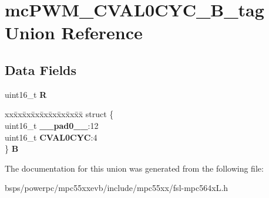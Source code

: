 \hypertarget{unionmcPWM__CVAL0CYC__16B__tag}{}\section{mc\+P\+W\+M\+\_\+\+C\+V\+A\+L0\+C\+Y\+C\+\_\+B\+\_\+tag Union Reference}
\label{unionmcPWM__CVAL0CYC__16B__tag}
\subsection*{Data Fields}
\begin{DoxyCompactItemize}
\item 
\mbox{\label{unionmcPWM__CVAL0CYC__16B__tag_a1b9d229d8a58183cb13a2c23169bbc10}} 
uint16\+\_\+t {\bfseries R}
\item 
\mbox{\label{unionmcPWM__CVAL0CYC__16B__tag_a2803aee870871152b97f482433b5913a}} 
\begin{tabbing}
xx\=xx\=xx\=xx\=xx\=xx\=xx\=xx\=xx\=\kill
struct \{\\
\>uint16\_t {\bfseries \_\_pad0\_\_}:12\\
\>uint16\_t {\bfseries CVAL0CYC}:4\\
\} {\bfseries B}\\

\end{tabbing}\end{DoxyCompactItemize}


The documentation for this union was generated from the following file\+:\begin{DoxyCompactItemize}
\item 
bsps/powerpc/mpc55xxevb/include/mpc55xx/fsl-\/mpc564x\+L.\+h\end{DoxyCompactItemize}
